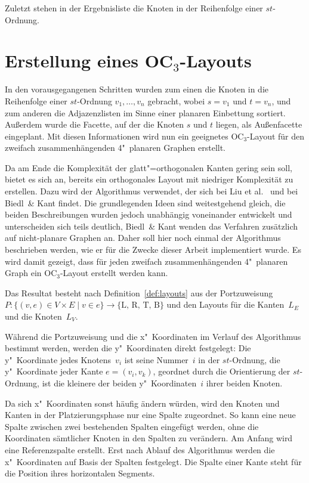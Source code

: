 \documentclass[a4paper]{scrreprt}
\theoremstyle{definition}
\begin{document}
Zuletzt stehen in der Ergebnisliste die Knoten in der Reihenfolge einer $st$-Ordnung.

\section{Erstellung eines OC$_3$-Layouts}
\label{sec:oc3algo}

In den vorausgegangenen Schritten wurden zum einen die Knoten in die Reihenfolge einer $st$-Ordnung $v_1, \dots, v_n$ gebracht, wobei $s = v_1$ und $t = v_n$, und zum anderen die Adjazenzlisten im Sinne einer planaren Einbettung sortiert. Außerdem wurde die Facette, auf der die Knoten $s$ und $t$ liegen, als Außenfacette eingeplant. Mit diesen Informationen wird nun ein geeignetes OC$_3$-Layout für den zweifach zusammenhängenden 4"~planaren Graphen erstellt. 

Da am Ende die Komplexität der glatt"=orthogonalen Kanten gering sein soll, bietet es sich an, bereits ein orthogonales Layout mit niedriger Komplexität zu erstellen. Dazu wird der Algorithmus verwendet, der sich bei Liu et al.~\cite{liu+etal-98} und bei Biedl~\& Kant \cite{biedl+kant-98} findet. Die grundlegenden Ideen sind weitestgehend gleich, die beiden Beschreibungen wurden jedoch unabhängig voneinander entwickelt und unterscheiden sich teils deutlich, Biedl~\& Kant wenden das Verfahren zusätzlich auf nicht-planare Graphen an. Daher soll hier noch einmal der Algorithmus beschrieben werden, wie er für die Zwecke dieser Arbeit implementiert wurde. Es wird damit gezeigt, dass für jeden zweifach zusammenhängenden 4"~planaren Graph ein OC$_3$-Layout erstellt werden kann.

Das Resultat besteht nach Definition~\ref{def:layouts} aus der Portzuweisung $P: \{(v, e) \in V \times E \mid v \in e\} \to \{\text{L, R, T, B}\}$ und den Layouts für die Kanten~$L_E$ und die Knoten~$L_V$.

Während die Portzuweisung und die x"~Koordinaten im Verlauf des Algorithmus bestimmt werden, werden die y"~Koordinaten direkt festgelegt: Die y"~Koordinate jedes Knotens~$v_i$ ist seine Nummer~$i$ in der $st$-Ordnung, die y"~Koordinate jeder Kante $e = (v_i, v_k)$, geordnet durch die Orientierung der $st$-Ordnung, ist die kleinere der beiden y"~Koordinaten~$i$ ihrer beiden Knoten.

Da sich x"~Koordinaten sonst häufig ändern würden, wird den Knoten und Kanten in der Platzierungsphase nur eine Spalte zugeordnet. So kann eine neue Spalte zwischen zwei bestehenden Spalten eingefügt werden, ohne die Koordinaten sämtlicher Knoten in den Spalten zu verändern. Am Anfang wird eine Referenzspalte erstellt. Erst nach Ablauf des Algorithmus werden die x"~Koordinaten auf Basis der Spalten festgelegt. Die Spalte einer Kante steht für die Position ihres horizontalen Segments.
\end{document}
